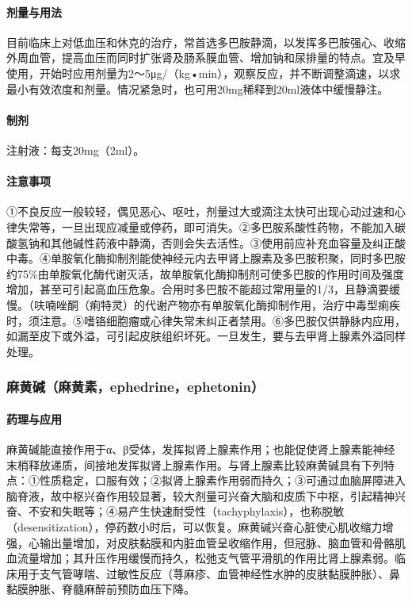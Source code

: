 \paragraph{剂量与用法}

目前临床上对低血压和休克的治疗，常首选多巴胺静滴，以发挥多巴胺强心、收缩外周血管，提高血压而同时扩张肾及肠系膜血管、增加钠和尿排量的特点。宜及早使用，开始时应用剂量为2～5μg/（kg•min），观察反应，并不断调整滴速，以求最小有效浓度和剂量。情况紧急时，也可用20mg稀释到20ml液体中缓慢静注。

\paragraph{制剂}

注射液：每支20mg（2ml）。

\paragraph{注意事项}

①不良反应一般较轻，偶见恶心、呕吐，剂量过大或滴注太快可出现心动过速和心律失常等，一旦出现应减量或停药，即可消失。②多巴胺系酸性药物，不能加入碳酸氢钠和其他碱性药液中静滴，否则会失去活性。③使用前应补充血容量及纠正酸中毒。④单胺氧化酶抑制剂能使神经元内去甲肾上腺素及多巴胺积聚，同时多巴胺约75\%由单胺氧化酶代谢灭活，故单胺氧化酶抑制剂可使多巴胺的作用时间及强度增加，甚至可引起高血压危象。合用时多巴胺不能超过常用量的1/3，且静滴要缓慢。（呋喃唑酮（痢特灵）的代谢产物亦有单胺氧化酶抑制作用，治疗中毒型痢疾时，须注意。⑤嗜铬细胞瘤或心律失常未纠正者禁用。⑥多巴胺仅供静脉内应用，如漏至皮下或外溢，可引起皮肤组织坏死。一旦发生，要与去甲肾上腺素外溢同样处理。

\subsubsection{麻黄碱（麻黄素，ephedrine，ephetonin）}

\paragraph{药理与应用}

麻黄碱能直接作用于α、β受体，发挥拟肾上腺素作用；也能促使肾上腺素能神经末梢释放递质，间接地发挥拟肾上腺素作用。与肾上腺素比较麻黄碱具有下列特点：①性质稳定，口服有效；②拟肾上腺素作用弱而持久；③可通过血脑屏障进入脑脊液，故中枢兴奋作用较显著，较大剂量可兴奋大脑和皮质下中枢，引起精神兴奋、不安和失眠等；④易产生快速耐受性（tachyphylaxis），也称脱敏（desensitization），停药数小时后，可以恢复。麻黄碱兴奋心脏使心肌收缩力增强，心输出量增加，对皮肤黏膜和内脏血管呈收缩作用，但冠脉、脑血管和骨骼肌血流量增加；其升压作用缓慢而持久，松弛支气管平滑肌的作用比肾上腺素弱。临床用于支气管哮喘、过敏性反应（荨麻疹、血管神经性水肿的皮肤黏膜肿胀）、鼻黏膜肿胀、脊髓麻醉前预防血压下降。

